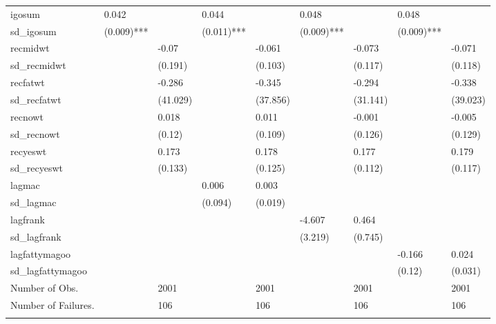 \begin{table}[ht]
\begin{tabular}{lllllllll}
  igosum & 0.042 &  & 0.044 &  & 0.048 &  & 0.048 &  \\ 
  sd\_igosum & (0.009)*** &  & (0.011)*** &  & (0.009)*** &  & (0.009)*** &  \\ 
  recmidwt &  & -0.07 &  & -0.061 &  & -0.073 &  & -0.071 \\ 
  sd\_recmidwt &  & (0.191)  &  & (0.103)  &  & (0.117)  &  & (0.118)  \\ 
  recfatwt &  & -0.286 &  & -0.345 &  & -0.294 &  & -0.338 \\ 
  sd\_recfatwt &  & (41.029)  &  & (37.856)  &  & (31.141)  &  & (39.023)  \\ 
  recnowt &  & 0.018 &  & 0.011 &  & -0.001 &  & -0.005 \\ 
  sd\_recnowt &  & (0.12)  &  & (0.109)  &  & (0.126)  &  & (0.129)  \\ 
  recyeswt &  & 0.173 &  & 0.178 &  & 0.177 &  & 0.179 \\ 
  sd\_recyeswt &  & (0.133)  &  & (0.125)  &  & (0.112)  &  & (0.117)  \\ 
  lagmac &  &  & 0.006 & 0.003 &  &  &  &  \\ 
  sd\_lagmac &  &  & (0.094)  & (0.019)  &  &  &  &  \\ 
  lagfrank &  &  &  &  & -4.607 & 0.464 &  &  \\ 
  sd\_lagfrank &  &  &  &  & (3.219)  & (0.745)  &  &  \\ 
  lagfattymagoo &  &  &  &  &  &  & -0.166 & 0.024 \\ 
  sd\_lagfattymagoo &  &  &  &  &  &  & (0.12)  & (0.031)  \\ 
  Number of Obs. &  & 2001 &  & 2001 &  & 2001 &  & 2001 \\ 
  Number of Failures. &  & 106 &  & 106 &  & 106 &  & 106 \\ 
   \hline \footnotesize{  }
\end{tabular}
\end{table}
